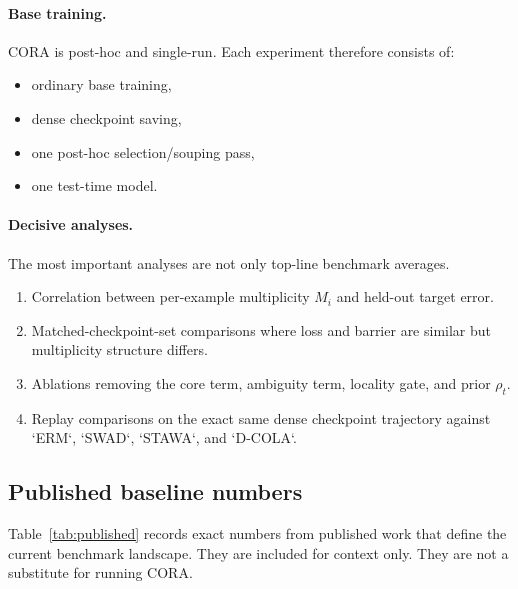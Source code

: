 \documentclass{article}
\newcommand{\cora}{\textup{\textsc{CORA}}}
\newcommand{\swad}{\textup{\textsc{SWAD}}}
\newcommand{\stawa}{\textup{\textsc{STAWA}}}
\newcommand{\dcola}{\textup{\textsc{D-COLA}}}
\begin{document}
\paragraph{Base training.}
\cora{} is post-hoc and single-run. Each experiment therefore consists of:
\begin{itemize}[leftmargin=1.4em]
    \item ordinary base training,
    \item dense checkpoint saving,
    \item one post-hoc selection/souping pass,
    \item one test-time model.
\end{itemize}

\paragraph{Decisive analyses.}
The most important analyses are not only top-line benchmark averages.
\begin{enumerate}[leftmargin=1.4em]
    \item Correlation between per-example multiplicity $M_i$ and held-out target error.
    \item Matched-checkpoint-set comparisons where loss and barrier are similar but multiplicity structure differs.
    \item Ablations removing the core term, ambiguity term, locality gate, and prior $\rho_t$.
    \item Replay comparisons on the exact same dense checkpoint trajectory against `ERM`, `\swad`, `\stawa`, and `\dcola`.
\end{enumerate}

\subsection{Published baseline numbers}

Table~\ref{tab:published} records exact numbers from published work that define the current benchmark landscape. They are included for context only. They are not a substitute for running \cora{}.
\end{document}
